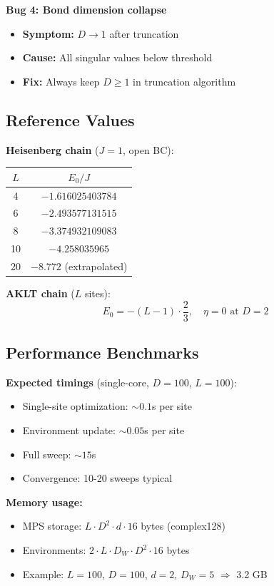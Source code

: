 \documentclass[aps,prb,onecolumn,scriptaddress]{revtex4-2}
\begin{document}
	\textbf{Bug 4: Bond dimension collapse}
	\begin{itemize}
		\item \textbf{Symptom:} $D \to 1$ after truncation
		\item \textbf{Cause:} All singular values below threshold
		\item \textbf{Fix:} Always keep $D \geq 1$ in truncation algorithm
	\end{itemize}
	
	\subsection{Reference Values}
	
	\textbf{Heisenberg chain} ($J=1$, open BC):
	\begin{center}
		\begin{tabular}{@{}cc@{}}
			\toprule
			$L$ & $E_0 / J$ \\
			\midrule
			4 & $-1.616025403784$ \\
			6 & $-2.493577131515$ \\
			8 & $-3.374932109083$ \\
			10 & $-4.258035965$ \\
			20 & $-8.772$ (extrapolated) \\
			\bottomrule
		\end{tabular}
	\end{center}
	
	\textbf{AKLT chain} ($L$ sites):
	\begin{equation}
		E_0 = -(L-1) \cdot \frac{2}{3}, \quad \eta = 0 \text{ at } D=2
	\end{equation}
	
	\subsection{Performance Benchmarks}
	
	\textbf{Expected timings} (single-core, $D=100$, $L=100$):
	\begin{itemize}
		\item Single-site optimization: $\sim 0.1$s per site
		\item Environment update: $\sim 0.05$s per site
		\item Full sweep: $\sim 15$s
		\item Convergence: 10-20 sweeps typical
	\end{itemize}
	
	\textbf{Memory usage:}
	\begin{itemize}
		\item MPS storage: $L \cdot D^2 \cdot d \cdot 16$ bytes (complex128)
		\item Environments: $2 \cdot L \cdot D_W \cdot D^2 \cdot 16$ bytes
		\item Example: $L=100$, $D=100$, $d=2$, $D_W=5$ $\Rightarrow$ 3.2 GB
	\end{itemize}
	
\end{document}

